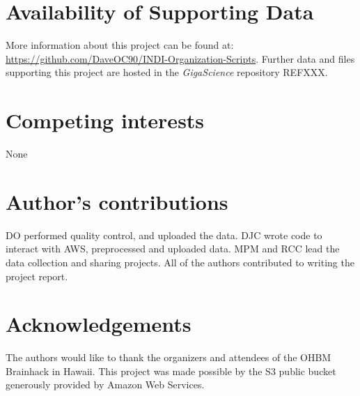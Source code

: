 \documentclass[twocolumn]{bmcart}%
\begin{document}
\begin{backmatter}

\section*{Availability of Supporting Data}
More information about this project can be found at: \url{https://github.com/DaveOC90/INDI-Organization-Scripts}. Further data and files supporting this project are hosted in the \emph{GigaScience} repository REFXXX.

\section*{Competing interests}
None

\section*{Author's contributions}
DO performed quality control, and uploaded the data. DJC wrote code to
interact with AWS, preprocessed and uploaded data. MPM and RCC lead the
data collection and sharing projects. All of the authors contributed to
writing the project report.

\section*{Acknowledgements}
The authors would like to thank the organizers and attendees of the OHBM
Brainhack in Hawaii. This project was made possible by the S3 public
bucket generously provided by Amazon Web Services.

  
  


\end{backmatter}
\end{document}
